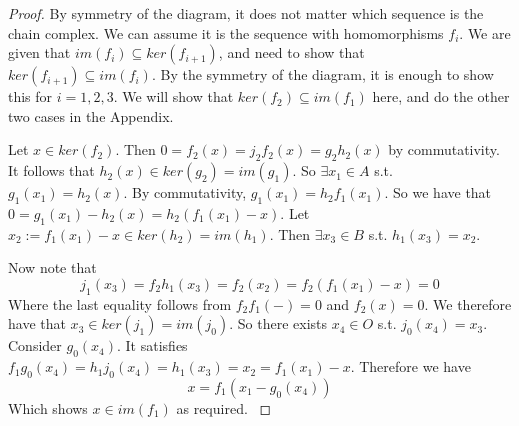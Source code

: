 \begin{proof}
By symmetry of the diagram, it does not matter which sequence is the chain complex. We can assume it is the sequence with homomorphisms $f_i$. We are given that $im(f_i)\subseteq ker(f_{i+1})$, and need to show that $ker(f_{i+1})\subseteq im(f_i)$. By the symmetry of the diagram, it is enough to show this for $i=1,2,3$. We will show that $ker(f_2)\subseteq im(f_1)$ here, and do the other two cases in the Appendix.

Let $x\in ker(f_2)$. Then $0=f_2(x)=j_2f_2(x)=g_2h_2(x)$ by commutativity. It follows that $h_2(x)\in ker(g_2)=im(g_1)$. So $\exists x_1\in A$ s.t. $g_1 (x_1)=h_2(x)$. By commutativity, $g_1(x_1)=h_2f_1 (x_1)$. So we have that $0=g_1 (x_1)-h_2(x)=h_2(f_1 (x_1)-x)$. Let $x_2:=f_1(x_1)-x\in ker(h_2)=im(h_1)$. Then $\exists x_3\in B$ s.t. $h_1(x_3)=x_2$.

Now note that $$j_1(x_3)=f_2h_1(x_3)=f_2(x_2)=f_2(f_1(x_1)-x)=0$$
Where the last equality follows from $f_2f_1(-)=0$ and $f_2(x)=0$. We therefore have that $x_3\in ker(j_1)=im(j_0)$. So there exists $x_4\in O$ s.t. $j_0(x_4)=x_3$. Consider $g_0(x_4).$ It satisfies $f_1g_0(x_4)=h_1j_0(x_4)=h_1(x_3)=x_2=f_1(x_1)-x$. Therefore we have
$$x=f_1(x_1-g_0(x_4))$$
Which shows $x\in im(f_1)$ as required.
\cite{Eilenberg}
\end{proof}